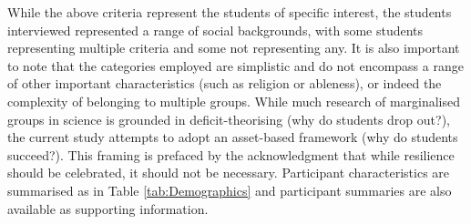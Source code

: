 While the above criteria represent the students of specific interest, the students interviewed represented a range of social backgrounds, with some students representing multiple criteria and some not representing any. It is also important to note that the categories employed are simplistic and do not encompass a range of other important characteristics (such as religion or ableness), or indeed the complexity of belonging to multiple groups. While much research of marginalised groups in science is grounded in deficit-theorising (why do students drop out?), the current study attempts to adopt an asset-based framework (why do students succeed?). This framing is prefaced by the acknowledgment that while resilience should be celebrated, it should not be necessary. Participant characteristics are summarised as in Table \ref{tab:Demographics} and participant summaries are also available as supporting information. 



